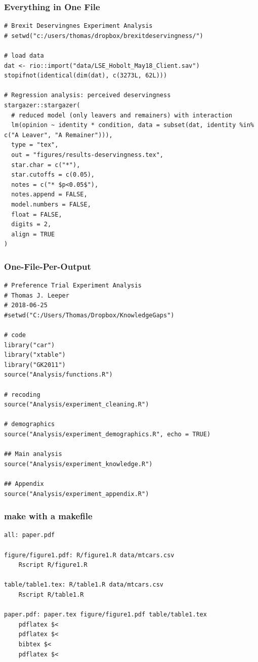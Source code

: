 \documentclass[14pt]{beamer}
\begin{document}
\begin{frame}[fragile]
\frametitle{Everything in One File}

\scriptsize

\begin{verbatim}
# Brexit Deservingnes Experiment Analysis
# setwd("c:/users/thomas/dropbox/brexitdeservingness/")

# load data
dat <- rio::import("data/LSE_Hobolt_May18_Client.sav")
stopifnot(identical(dim(dat), c(3273L, 62L)))

# Regression analysis: perceived deservingness
stargazer::stargazer(
  # reduced model (only leavers and remainers) with interaction
  lm(opinion ~ identity * condition, data = subset(dat, identity %in% c("A Leaver", "A Remainer"))),
  type = "tex",
  out = "figures/results-deservingness.tex",
  star.char = c("*"),
  star.cutoffs = c(0.05),
  notes = c("* $p<0.05$"),
  notes.append = FALSE,
  model.numbers = FALSE,
  float = FALSE,
  digits = 2,
  align = TRUE
)
\end{verbatim}
\end{frame}



\begin{frame}[fragile]
\frametitle{One-File-Per-Output}

\scriptsize

\begin{verbatim}
# Preference Trial Experiment Analysis
# Thomas J. Leeper
# 2018-06-25
#setwd("C:/Users/Thomas/Dropbox/KnowledgeGaps")

# code
library("car")
library("xtable")
library("GK2011")
source("Analysis/functions.R")

# recoding
source("Analysis/experiment_cleaning.R")

# demographics
source("Analysis/experiment_demographics.R", echo = TRUE)

## Main analysis
source("Analysis/experiment_knowledge.R")

## Appendix
source("Analysis/experiment_appendix.R")
\end{verbatim}
\end{frame}





\begin{frame}[fragile]
\frametitle{make with a makefile}

\scriptsize
\begin{verbatim}
all: paper.pdf

figure/figure1.pdf: R/figure1.R data/mtcars.csv
    Rscript R/figure1.R

table/table1.tex: R/table1.R data/mtcars.csv
    Rscript R/table1.R

paper.pdf: paper.tex figure/figure1.pdf table/table1.tex
    pdflatex $<
    pdflatex $<
    bibtex $<
    pdflatex $<
\end{verbatim}
\end{frame}
\end{document}
